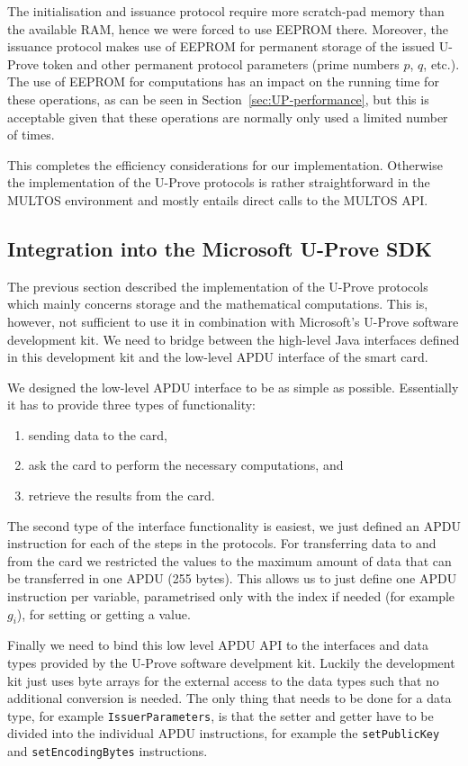 The initialisation and issuance protocol require more scratch-pad memory than
the available RAM, hence we were forced to use EEPROM there. Moreover, the
issuance protocol makes use of EEPROM for permanent storage of the issued
U-Prove token and other permanent protocol parameters (prime numbers $p$, $q$,
etc.). The use of EEPROM for computations has an impact on the running time for
these operations, as can be seen in Section~\ref{sec:UP-performance}, but this
is acceptable given that these operations are normally only used a limited
number of times.

This completes the efficiency considerations for our implementation. Otherwise
the implementation of the U-Prove protocols is rather straightforward in the
MULTOS environment and mostly entails direct calls to the MULTOS API.

\subsection{Integration into the Microsoft U-Prove SDK}

The previous section described the implementation of the U-Prove protocols which
mainly concerns storage and the mathematical computations. This is, however, not
sufficient to use it in combination with Microsoft's U-Prove software
development kit. We need to bridge between the high-level Java interfaces
defined in this development kit and the low-level APDU interface of the smart
card.

We designed the low-level APDU interface to be as simple as possible.
Essentially it has to provide three types of functionality:
\begin{enumerate}
  \item sending data to the card,
  \item ask the card to perform the necessary computations, and
  \item retrieve the results from the card.
\end{enumerate}
The second type of the interface functionality is easiest, we just defined an
APDU instruction for each of the steps in the protocols. For transferring data
to and from the card we restricted the values to the maximum amount of data that
can be transferred in one APDU (255 bytes). This allows us to just define one
APDU instruction per variable, parametrised only with the index if needed (for
example $g_i$), for setting or getting a value.

Finally we need to bind this low level APDU API to the interfaces and data types
provided by the U-Prove software develpment kit. Luckily the development kit
just uses byte arrays for the external access to the data types such that no
additional conversion is needed. The only thing that needs to be done for a data
type, for example \lstinline{IssuerParameters}, is that the setter and getter
have to be divided into the individual APDU instructions, for example the
\lstinline{setPublicKey} and \lstinline{setEncodingBytes} instructions.

